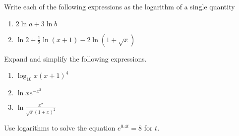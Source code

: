 \documentclass[12pt, a4paper]{article}
\begin{document}
\begin{ex}
  Write each of the following expressions as the logarithm of a single
  quantity
  \begin{enumerate}
  \item \(2 \ln a + 3 \ln b\)
  \item \(\ln 2 + \frac{1}{2} \ln(x+1) - 2 \ln(1 + \sqrt{x})\)
  \end{enumerate}
\end{ex}
\vspace{-0.4in}
\begin{ex}
  Expand and simplify the following expressions.
  \begin{enumerate}
  \item \(\log_{10} x(x+1)^4\)
  \item \(\ln x e^{-x^2}\)
  \item \(\ln \frac{x^2}{\sqrt{x}(1+x)^2}\)
  \end{enumerate}
\end{ex}
\vspace{-0.8in}
\begin{ex}
  Use logarithms to solve the equation \(e^{0.4t}=8\) for \(t\).
\end{ex}
\vspace{-2in}
\end{document}
